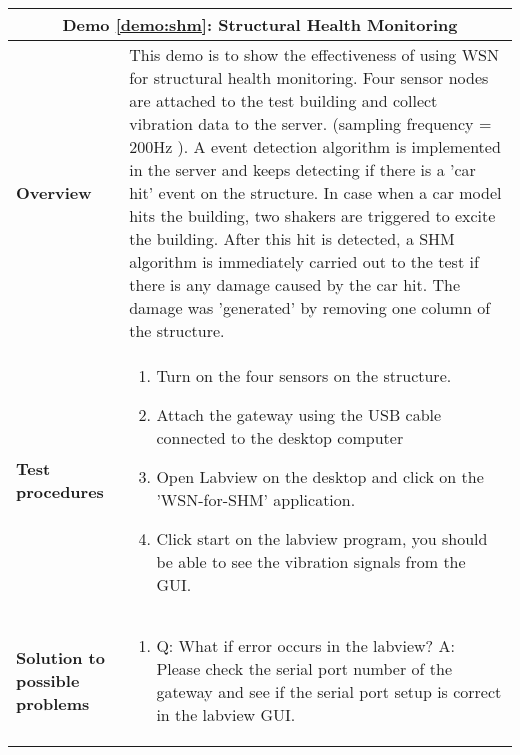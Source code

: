 \begin{center}
	\begin{tabular}{ | p{2cm} | p{10cm} | }
		\hline
		\multicolumn{2}{|c|}{\textbf{Demo \ref{demo:shm}: Structural Health Monitoring}} \\ \hline
		\textbf{Overview} &  This demo is to show the effectiveness of using WSN for structural health monitoring.  Four sensor nodes are attached to the test building and collect vibration data to the server. (sampling frequency = 200Hz ).
A event detection algorithm is implemented in the server and keeps detecting if there is a 'car hit' event on the structure. 
In case when a car model hits the building, two shakers are triggered to excite the building. After this hit is detected, a SHM algorithm is immediately carried out to the test if there is any damage caused by the car hit. The damage was 'generated' by removing one column of the structure. \\ \hline
		\textbf{Test procedures} &
		\begin{enumerate}
		\item Turn on the four sensors on the structure.
		\item Attach the gateway using the USB cable connected to the desktop computer
		\item Open Labview on the desktop and click on the 'WSN-for-SHM' application.
		\item Click start on the labview program, you should be able to see the vibration signals from the GUI.
		\end{enumerate} \\ \hline
		\textbf{Solution to possible problems} &
		\begin{enumerate}
		\item Q: What if error occurs in the labview?
		A: Please check the serial port number of the gateway and see if the serial port setup is correct in the labview GUI.
		\end{enumerate}  \\
		\hline
	\end{tabular}
\end{center}

